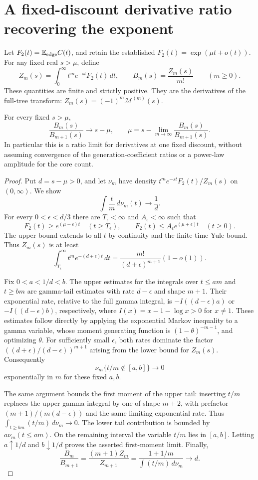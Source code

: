 \section{A fixed-discount derivative ratio recovering the exponent}
\label{tl:section}

Let $F_2(t)=\mathbb E_{\rm edge}C(t)$, and retain the established
$F_2(t)=\exp(\mu t+o(t))$.  For any fixed real $s>\mu$, define
\[
 Z_m(s)=\int_0^\infty t^m e^{-st}F_2(t)\,dt,
 \qquad B_m(s)=\frac{Z_m(s)}{m!}\qquad(m\ge0).
\]
These quantities are finite and strictly positive.  They are the
derivatives of the full-tree transform:
$Z_m(s)=(-1)^m\mathcal M^{(m)}(s)$.

\begin{theorem}
\label{tl:ratio}
For every fixed $s>\mu$,
\[
 \boxed{\displaystyle
 \frac{B_m(s)}{B_{m+1}(s)}\longrightarrow s-\mu,
 \qquad
 \mu=s-\lim_{m\to\infty}\frac{B_m(s)}{B_{m+1}(s)}.}
\]
In particular this is a ratio limit for derivatives at one fixed
discount, without assuming convergence of the generation-coefficient
ratios or a power-law amplitude for the core count.
\end{theorem}
\begin{proof}
Put $d=s-\mu>0$, and let $\nu_m$ have density
$t^m e^{-st}F_2(t)/Z_m(s)$ on $(0,\infty)$.  We show
\[
 \int\frac{t}{m}\,d\nu_m(t)\longrightarrow\frac1d.
\]
For every $0<\epsilon<d/3$ there are $T_\epsilon<\infty$ and
$A_\epsilon<\infty$ such that
\[
 F_2(t)\ge e^{(\mu-\epsilon)t}\quad(t\ge T_\epsilon),
 \qquad F_2(t)\le A_\epsilon e^{(\mu+\epsilon)t}
 \quad(t\ge0).
\]
The upper bound extends to all $t$ by continuity and the finite-time
Yule bound.  Thus $Z_m(s)$ is at least
\[
 \int_{T_\epsilon}^\infty t^m e^{-(d+\epsilon)t}\,dt
 =\frac{m!}{(d+\epsilon)^{m+1}}(1-o(1)).
\]

Fix $0<a<1/d<b$.  The upper estimates for the integrals over
$t\le am$ and $t\ge bm$ are gamma-tail estimates with rate
$d-\epsilon$ and shape $m+1$.  Their exponential rate, relative to
the full gamma integral, is $-I((d-\epsilon)a)$ or
$-I((d-\epsilon)b)$, respectively, where
$I(x)=x-1-\log x>0$ for $x\ne1$.
These estimates follow directly by applying the exponential Markov
inequality to a gamma variable, whose moment generating function is
$(1-\theta)^{-m-1}$, and optimizing $\theta$.
For sufficiently small $\epsilon$, both rates dominate the factor
$((d+\epsilon)/(d-\epsilon))^{m+1}$ arising from the lower bound
for $Z_m(s)$.  Consequently
\[
 \nu_m\{t/m\notin[a,b]\}\longrightarrow0
\]
exponentially in $m$ for these fixed $a,b$.

The same argument bounds the first moment of the upper tail: inserting
$t/m$ replaces the upper gamma integral by one of shape $m+2$, with
prefactor $(m+1)/(m(d-\epsilon))$ and the same limiting exponential
rate.  Thus
$\int_{t\ge bm}(t/m)\,d\nu_m\to0$.  The lower tail contribution
is bounded by $a\nu_m(t\le am)$.  On the remaining interval the
variable $t/m$ lies in $[a,b]$.  Letting $a\uparrow1/d$ and
$b\downarrow1/d$ proves the asserted first-moment limit.  Finally,
\[
 \frac{B_m}{B_{m+1}}=
 \frac{(m+1)Z_m}{Z_{m+1}}=
 \frac{1+1/m}{\int(t/m)\,d\nu_m}\longrightarrow d.
\]
\end{proof}

